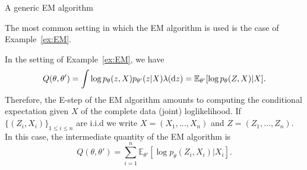 \documentclass[english,graybox,envcountchap,envcountsame,sectrefs,shortlabels]{svmono}
\theoremstyle{style}
\newcommand{\eqsp}{}
\begin{document}
\begin{algorithm}
\caption{A generic EM algorithm}\label{alg:EM}
\end{algorithm}

The most common setting in which the EM algorithm is used is the case of Example~\ref{ex:EM}. 

\begin{example}
\label{ex:EM:alg}
In the setting of Example~\ref{ex:EM}, we have
$$
Q(\theta,\theta') = \int \log p_\theta(z,X)p_{\theta'}(z|X)\lambda(\rmd z) = \mathbb{E}_{\theta'}[\log p_\theta(Z,X)|X]\eqsp.
$$
Therefore, the E-step of the EM algorithm amounts to computing the conditional expectation given $X$ of the complete data (joint) loglikelihood. If $\{(Z_i,X_i)\}_{1\leq i  \leq n}$ are i.i.d we write $X = (X_1,\ldots,X_n)$ and $Z = (Z_1,\ldots,Z_n)$. In this case, the intermediate quantity of the EM algorithm is
$$
Q(\theta,\theta') = \sum_{i=1}^n \mathbb{E}_{\theta'}[\log p_\theta(Z_i,X_i)|X_i]\eqsp.
$$
\end{example}
\end{document}
